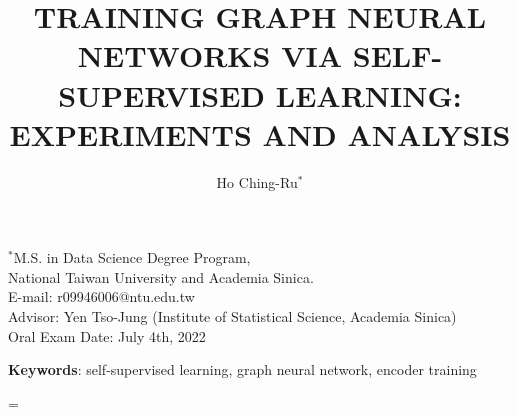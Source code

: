 \documentclass[11pt]{article}
\title{
\renewcommand{\baselinestretch}{1.17}\normalsize\bf%
\uppercase{Training Graph Neural Networks via Self-Supervised Learning: Experiments and Analysis}
}
\author{Ho Ching-Ru$^{*}$}
\begin{document}
\date{}
\maketitle

\vspace{-0.5cm}

\begin{center}
{\footnotesize 
$^{*}$M.S. in Data Science Degree Program,\\ National Taiwan University and Academia Sinica.  \\
E-mail: r09946006@ntu.edu.tw \\
Advisor: Yen Tso-Jung (Institute of Statistical Science, Academia Sinica)\\
Oral Exam Date: July 4th, 2022
}
\end{center}

\bigskip


\medskip
{\small{\bf Keywords}{:} 
self-supervised learning, graph neural network, encoder training
}

\baselineskip=\normalbaselineskip


\newpage

\newpage

\newpage

\newpage

\newpage

\newpage
 
\newpage
 
\end{document}

